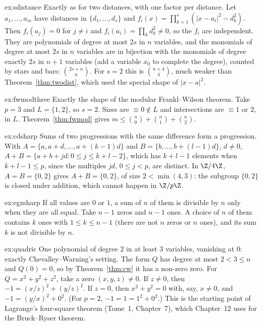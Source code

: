 \begin{solution}{ex:sdistance}
\idea Exactly as for two distances, with one factor per distance.
\writeup Let $a_1,\dots,a_m$ have distances in $\{d_1,\dots,d_s\}$ and $f_i(x)=\prod_{k=1}^s(|x-a_i|^2-d_k^2)$. Then $f_i(a_j)=0$ for $j\ne i$ and $f_i(a_i)=\prod_kd_k^2\ne0$, so the $f_i$ are independent. They are
polynomials of degree at most $2s$ in $n$ variables, and the monomials of degree at most $2s$ in $n$ variables are in bijection with the monomials of degree exactly $2s$ in $n+1$ variables (add a variable $x_0$
to complete the degree), counted by stars and bars: $\binom{2s+n}{n}$. For $s=2$ this is $\binom{n+4}4$, much weaker than Theorem~\ref{thm:twodist}, which used the special shape of $|x-a|^2$.
\end{solution}

\begin{solution}{ex:fwmodthree}
\idea Exactly the shape of the modular Frankl--Wilson theorem.
\writeup Take $p=3$ and $L=\{1,2\}$, so $s=2$. Sizes are $\equiv0\notin L$ and intersections are $\equiv1$ or $2$, in $L$. Theorem~\ref{thm:fwmod} gives $m\le\binom n0+\binom n1+\binom n2$.
\end{solution}

\begin{solution}{ex:cdsharp}
\idea Sums of two progressions with the same difference form a progression.
\writeup With $A=\{a,a+d,\dots,a+(k-1)d\}$ and $B=\{b,\dots,b+(l-1)d\}$, $d\ne0$, $A+B=\{a+b+jd:0\le j\le k+l-2\}$, which has $k+l-1$ elements when $k+l-1\le p$, since the multiples $jd$, $0\le j<p$, are distinct. In
$\Z/4\Z$, $A=B=\{0,2\}$ gives $A+B=\{0,2\}$, of size $2<\min(4,3)$: the subgroup $\{0,2\}$ is closed under addition, which cannot happen in $\Z/p\Z$.
\end{solution}

\begin{solution}{ex:egzsharp}
\idea If all values are $0$ or $1$, a sum of $n$ of them is divisible by $n$ only when they are all equal.
\writeup Take $n-1$ zeros and $n-1$ ones. A choice of $n$ of them contains $k$ ones with $1\le k\le n-1$ (there are not $n$ zeros or $n$ ones), and its sum $k$ is not divisible by $n$.
\end{solution}

\begin{solution}{ex:quadric}
\idea One polynomial of degree $2$ in at least $3$ variables, vanishing at $0$: exactly Chevalley--Warning's setting.
\writeup The form $Q$ has degree at most $2<3\le n$ and $Q(0)=0$, so by Theorem~\ref{thm:cw} it has a non-zero zero. For $Q=x^2+y^2+z^2$, take a zero $(x,y,z)\ne0$. If $z\ne0$, then $-1=(x/z)^2+(y/z)^2$. If $z=0$,
then $x^2+y^2=0$ with, say, $x\ne0$, and $-1=(y/x)^2+0^2$. (For $p=2$, $-1=1=1^2+0^2$.) This is the starting point of Lagrange's four-square theorem (Tome~1, Chapter~7), which Chapter~12 uses for the
Bruck--Ryser theorem.
\end{solution}

